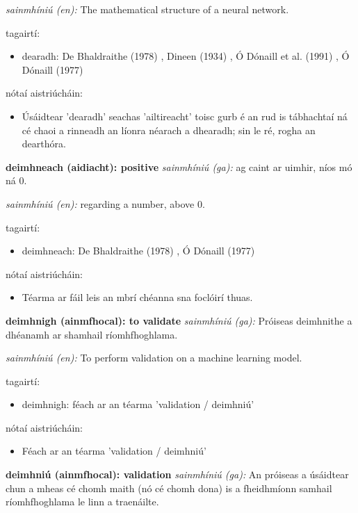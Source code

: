 \documentclass{article}
\begin{document}
\textit{sainmhíniú (en):} The mathematical structure of a neural network.

tagairtí:
\begin{itemize}
	\item dearadh: De Bhaldraithe (1978) \cite{de-bhaldraithe}, Dineen (1934) \cite{dineen}, Ó Dónaill et al. (1991) \cite{focloir-beag}, Ó Dónaill (1977) \cite{odonaill}
\end{itemize}

nótaí aistriúcháin:
\begin{itemize}
	\item Úsáidtear 'dearadh' seachas 'ailtireacht' toisc gurb é an rud is tábhachtaí ná cé chaoi a rinneadh an líonra néarach a dhearadh; sin le ré, rogha an dearthóra.
\end{itemize}


\textbf{deimhneach (aidiacht): positive}
\textit{sainmhíniú (ga):} ag caint ar uimhir, níos mó ná 0.

\textit{sainmhíniú (en):} regarding a number, above 0.

tagairtí:
\begin{itemize}
	\item deimhneach: De Bhaldraithe (1978) \cite{de-bhaldraithe}, Ó Dónaill (1977) \cite{odonaill}
\end{itemize}

nótaí aistriúcháin:
\begin{itemize}
	\item Téarma ar fáil leis an mbrí chéanna sna foclóirí thuas.
\end{itemize}


\textbf{deimhnigh (ainmfhocal): to validate}
\textit{sainmhíniú (ga):} Próiseas deimhnithe a dhéanamh ar shamhail ríomhfhoghlama.

\textit{sainmhíniú (en):} To perform validation on a machine learning model.

tagairtí:
\begin{itemize}
	\item deimhnigh: féach ar an téarma 'validation / deimhniú'
\end{itemize}

nótaí aistriúcháin:
\begin{itemize}
	\item Féach ar an téarma 'validation / deimhniú'
\end{itemize}


\textbf{deimhniú (ainmfhocal): validation}
\textit{sainmhíniú (ga):} An próiseas a úsáidtear chun a mheas cé chomh maith (nó cé chomh dona) is a fheidhmíonn samhail ríomhfhoghlama le linn a traenáilte.
\end{document}
